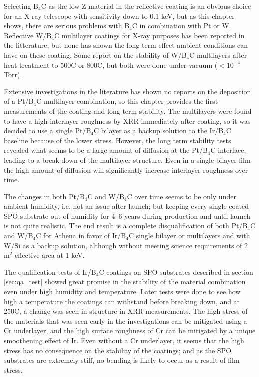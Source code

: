 Selecting B$_4$C as the low-Z material in the reflective coating is an obvious choice for an X-ray telescope with sensitivity down to 0.1 keV, but as this chapter shows, there are serious problems with B$_4$C in combination with Pt or W. Reflective W/B$_4$C multilayer coatings for X-ray purposes has been reported in the litterature\cite{Jankowski:1991kx,Morawe:2007vp}, but none has shown the long term effect ambient conditions can have on these coating. Some report on the stability of W/B$_4$C multilayers after heat treatment to 500\degr C\cite{JANKOWSKI:1990vd} or 800\degr C\cite{Rao:2013dt}, but both were done under vacuum ($<10^{-4}$ Torr).

Extensive investigations in the literature has shown no reports on the deposition of a Pt/B$_4$C multilayer combination, so this chapter provides the first measurements of the coating and long term stability. The multilayers were found to have a high interlayer roughness by XRR immediately after coating, so it was decided to use a single Pt/B$_4$C bilayer as a backup solution to the Ir/B$_4$C baseline because of the lower stress. However, the long term stability tests revealed what seems to be a large amount of diffusion at the Pt/B$_4$C interface, leading to a break-down of the multilayer structure. Even in a single bilayer film the high amount of diffusion will significantly increase interlayer roughness over time.

The changes in both Pt/B$_4$C and W/B$_4$C over time seems to be only under ambient humidity, i.e. not an issue after launch; but keeping every single coated SPO substrate out of humidity for 4--6 years during production and until launch is not quite realistic. The end result is a complete disqualification of both Pt/B$_4$C and W/B$_4$C for Athena in favor of Ir/B$_4$C single bilayer or multilayers and with W/Si as a backup solution, although without meeting science requirements of 2 m$^2$ effective area at 1 keV.

The qualification tests of Ir/B$_4$C coatings on SPO substrates described in section \ref{sec:qa_test} showed great promise in the stability of the material combination even under high humidity and temperature. Later tests were done to see how high a temperature the coatings can withstand before breaking down, and at 250\degr C, a change was seen in structure in XRR measurements. The high stress of the materials that was seen early in the investigations can be mitigated using a Cr underlayer, and the high surface roughness of Cr can be mitigated by a unique smoothening effect of Ir. Even without a Cr underlayer, it seems that the high stress has no consequence on the stability of the coatings; and as the SPO substrates are extremely stiff, no bending is likely to occur as a result of film stress.

